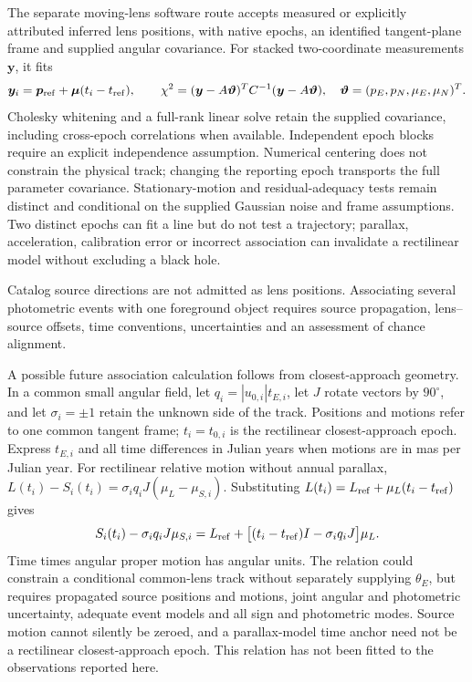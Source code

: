 The separate moving-lens software route accepts measured or explicitly
attributed inferred lens positions, with native epochs, an identified
tangent-plane frame and supplied angular covariance. For stacked
two-coordinate measurements $\boldsymbol y$, it fits
\begin{equation}
 \boldsymbol y_i=\boldsymbol p_{\rm ref}
       +\boldsymbol\mu(t_i-t_{\rm ref}),\qquad
 \chi^2=(\boldsymbol y-A\boldsymbol\vartheta)^T
           C^{-1}(\boldsymbol y-A\boldsymbol\vartheta),
 \quad
 \boldsymbol\vartheta=(p_E,p_N,\mu_E,\mu_N)^T .
 \label{eq:angular-skytrack}
\end{equation}
Cholesky whitening and a full-rank linear solve retain the supplied
covariance, including cross-epoch correlations when available.
Independent epoch blocks require an explicit independence assumption.
Numerical centering does not constrain the physical track; changing
the reporting epoch transports the full parameter covariance.
Stationary-motion and residual-adequacy tests remain distinct and
conditional on the supplied Gaussian noise and frame assumptions.
Two distinct epochs can fit a line but do not test a trajectory;
parallax, acceleration, calibration error or incorrect association
can invalidate a rectilinear model without excluding a black hole.

Catalog source directions are not admitted as lens positions.
Associating several photometric events with one foreground object
requires source propagation, lens--source offsets, time conventions,
uncertainties and an assessment of chance alignment.

A possible future association calculation follows from
closest-approach geometry. In a common small angular field, let
$q_i=|u_{0,i}|t_{E,i}$, let $J$ rotate vectors by $90^\circ$, and let
$\sigma_i=\pm1$ retain the unknown side of the track. Positions and motions
refer to one common tangent frame; $t_i=t_{0,i}$ is the rectilinear
closest-approach epoch. Express $t_{E,i}$ and all time differences in
Julian years when motions are in mas per Julian year. For rectilinear
relative motion without annual parallax,
$L(t_i)-S_i(t_i)=\sigma_iq_iJ(\mu_L-\mu_{S,i})$. Substituting
$L(t_i)=L_{\rm ref}+\mu_L(t_i-t_{\rm ref})$ gives
\begin{equation}
 S_i(t_i)-\sigma_iq_iJ\mu_{S,i}
 =L_{\rm ref}+\big[(t_i-t_{\rm ref})I-\sigma_iq_iJ\big]\mu_L .
 \label{eq:common-lens-association}
\end{equation}
Time times angular proper motion has angular units. The relation could
constrain a conditional common-lens track without separately supplying
$\theta_E$, but requires propagated source positions and motions,
joint angular and photometric uncertainty, adequate event models and
all sign and photometric modes. Source motion cannot silently be zeroed,
and a parallax-model time anchor need not be a rectilinear
closest-approach epoch. This relation has not been fitted to the
observations reported here.

